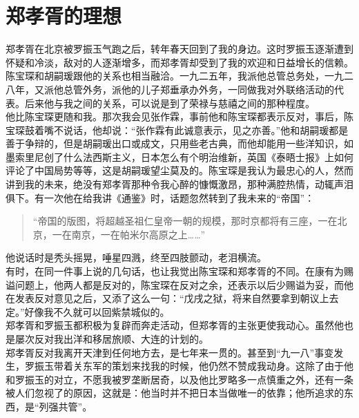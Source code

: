 \fancyhead[RO]{} %
\fancyhead[LE]{} %
\chapter*{郑孝胥的理想}
\thispagestyle{empty}
郑孝胥在北京被罗振玉气跑之后，转年春天回到了我的身边。这时罗振玉逐渐遭到怀疑和冷淡，敌对的人逐渐增多，而郑孝胥却受到了我的欢迎和日益增长的信赖。陈宝琛和胡嗣瑗跟他的关系也相当融洽。一九二五年，我派他总管总务处，一九二八年，又派他总管外务，派他的儿子郑垂承办外务，一同做我对外联络活动的代表。后来他与我之间的关系，可以说是到了荣禄与慈禧之间的那种程度。\\

他比陈宝琛更随和我。那次我会见张作霖，事前他和陈宝琛都表示反对，事后，陈宝琛鼓着嘴不说话，他却说：“张作霖有此诚意表示，见之亦善。”他和胡嗣瑗都是善于争辩的，但是胡嗣瑗出口或成文，只用些老古典，而他却能用一些洋知识，如墨索里尼创了什么法西斯主义，日本怎么有个明治维新，英国《泰晤士报》上如何评论了中国局势等等，这是胡嗣瑗望尘莫及的。陈宝琛是我认为最忠心的人，然而讲到我的未来，绝没有郑孝胥那种令我心醉的慷慨激昂，那种满腔热情，动辄声泪俱下。有一次他在给我讲《通鉴》时，话题忽然转到了我未来的“帝国”：\\

\begin{quote}
	“帝国的版图，将超越圣祖仁皇帝一朝的规模，那时京都将有三座，一在北京，一在南京，一在帕米尔高原之上……”\\
\end{quote}

他说话时是秃头摇晃，唾星四溅，终至四肢颤动，老泪横流。\\

有时，在同一件事上说的几句话，也让我觉出陈宝琛和郑孝胥的不同。在康有为赐谥问题上，他两人都是反对的，陈宝琛在反对之余，还表示以后少赐谥为妥，而他在发表反对意见之后，又添了这么一句：“戊戌之狱，将来自然要拿到朝议上去定。”好像我不久就可以回紫禁城似的。\\

郑孝胥和罗振玉都积极为复辟而奔走活动，但郑孝胥的主张更使我动心。虽然他也是屡次反对我出洋和移居旅顺、大连的计划的。\\

郑孝胥反对我离开天津到任何地方去，是七年来一贯的。甚至到“九一八”事变发生，罗振玉带着关东军的策划来找我的时候，他仍然不赞成我动身。这除了由于他和罗振玉的对立，不愿我被罗垄断居奇，以及他比罗略多一点慎重之外，还有一条被人们忽视了的原因，这就是：他当时并不把日本当做唯一的依靠；他所追求的东西，是“列强共管”。\\

